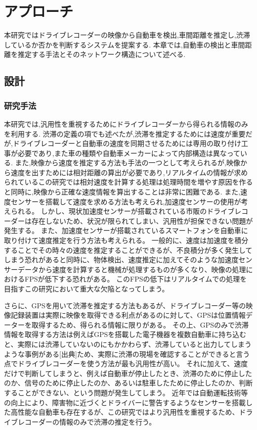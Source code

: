 \chapter{アプローチ}
本研究ではドライブレコーダーの映像から自動車を検出,車間距離を推定し,渋滞しているか否かを判断するシステムを提案する.
本章では,自動車の検出と車間距離を推定する手法とそのネットワーク構造について述べる.

\newpage

\section{設計}
\subsection{研究手法}
本研究では,汎用性を重視するためにドライブレコーダーから得られる情報のみを利用する.
渋滞の定義の項でも述べたが,渋滞を推定するためには速度が重要だが,ドライブレコーダーと自動車の速度を同期させるためには専用の取り付け工事が必要であり,また車の種類や自動車メーカーによって内部構造は異なっている.
また,映像から速度を推定する方法も手法の一つとして考えられるが,映像から速度を出すためには相対距離の算出が必要であり,リアルタイムの情報が求められているこの研究では相対速度を計算する処理は処理時間を増やす原因を作ると同時に,映像から正確な速度情報を算出することは非常に困難である.
また,速度センサーを搭載して速度を求める方法も考えられ,加速度センサーの使用が考えられる。
しかし、現状加速度センサーが搭載されている市販のドライブレコーダーは存在しないため、状況が限られてしまい、汎用性が担保できない問題が発生する。
また、加速度センサーが搭載されているスマートフォンを自動車に取り付けて速度推定を行う方法も考えられる。
一般的に、速度は加速度を積分することでその時々の速度を推定することができるが、不良積分が多く発生してしまう恐れがあると同時に、物体検出、速度推定に加えてそのような加速度センサーデータから速度を計算すると機械が処理するものが多くなり、映像の処理におけるFPSが低下する恐れがある。
このFPSの低下はリアルタイムでの処理を目指すこの研究において重大な欠陥となってしまう。

さらに、GPSを用いて渋滞を推定する方法もあるが、ドライブレコーダー等の映像記録装置は実際に映像を取得できる利点があるのに対して、GPSは位置情報データーを取得するため、得られる情報に限りがある。
その上、GPSのみで渋滞情報を取得する方法は例えばGPSを搭載した電子機器を複数自動車に持ち込むと、実際には渋滞していないのにもかかわらず、渋滞していると出力してしまうような事例がある[出典]ため、実際に渋滞の現場を確認することができると言う点でドライブレコーダーを使う方法が最も汎用性が高い。
それに加えて、速度だけで判断してしまうと、例えば自動車が停止したとき、渋滞のために停止したのか、信号のために停止したのか、あるいは駐車したために停止したのか、判断することができない、という問題が発生してしまう。
近年では自動運転技術等の向上により、障害物に近づくとドライバーに警告するようなセンサーを搭載した高性能な自動車も存在するが、この研究ではより汎用性を重視するため、ドライブレコーダーの情報のみで渋滞の推定を行う。

